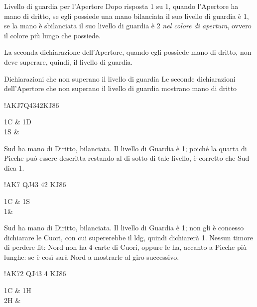 \documentclass[../corsofiori.tex]{subfiles}
\begin{document}
\begin{regola}{Livello di guardia per l'Apertore}
    Dopo risposta 1 su 1, quando l'Apertore ha mano di dritto, se egli possiede una mano bilanciata il suo livello di
    guardia è 1\SA, se la mano è sbilanciata il suo livello di guardia è 2 \emph{nel colore di apertura}, ovvero il
    colore più lungo che possiede.
\end{regola}

La seconda dichiarazione dell'Apertore, quando egli possiede mano di dritto, non deve superare, quindi, il livello di
guardia.

\begin{regola}{Dichiarazioni che non superano il livello di guardia}
    Le seconde dichiarazioni dell'Apertore che non superano il livello di guardia mostrano mano di dritto
\end{regola}

\begin{center}
\hand!{AKJ7}{Q43}{42}{KJ86}\quad\begin{biddingpair}
    1C & 1D\\
    1S & \\
\end{biddingpair}
\end{center}

Sud ha mano di Diritto, bilanciata.
Il livello di Guardia è 1\SA; poiché la quarta di
Picche può essere descritta restando al di
sotto di tale livello, è corretto che Sud dica
1\Sp.

\begin{center}
\hand!{AK7} {QJ43} {42} {KJ86}\quad\begin{biddingpair}
    1C & 1S\\
    1\SA & \\
\end{biddingpair}
\end{center}

Sud ha mano di Diritto, bilanciata.
Il livello di Guardia è 1\SA; non
gli è
concesso dichiarare le Cuori, con cui
supererebbe il \ac{ldg}, quindi dichiarerà 1\SA.
Nessun timore di perdere fit: Nord non ha 4
carte di Cuori, oppure le ha, accanto a
Picche più lunghe: se è così sarà Nord a mostrarle al giro successivo.

\begin{center}
\hand!{AK72} {QJ43} {4} {KJ86}\quad\begin{biddingpair}
    1C & 1H\\
    2H & \\
\end{biddingpair}
\end{center}
\end{document}
